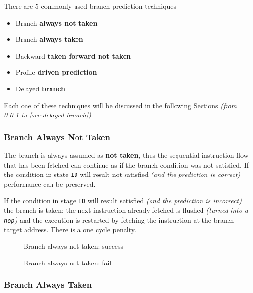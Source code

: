 \documentclass[english]{article}
\begin{document}
There are \(5\) commonly used branch prediction techniques:

\begin{itemize}
  \item Branch \textbf{always not taken}
  \item Branch \textbf{always taken}
  \item Backward \textbf{taken forward not taken}
  \item Profile \textbf{driven prediction}
  \item Delayed \textbf{branch}
\end{itemize}

Each one of these techniques will be discussed in the following Sections \textit{(from \ref{sec:branch-always-not-taken} to \ref{sec:delayed-branch})}.

\subsubsection{Branch Always Not Taken}
\label{sec:branch-always-not-taken}

The branch is always assumed as \textbf{not taken}, thus the sequential instruction flow that has been fetched can continue as if the branch condition was not satisfied.
If the condition in state \texttt{ID} will result not satisfied \textit{(and the prediction is correct)} performance can be preserved.

If the condition in stage \texttt{ID} will result satisfied \textit{(and the prediction is incorrect)} the branch is taken: the next instruction already fetched is flushed \textit{(turned into a \texttt{nop})} and the execution is restarted by fetching the instruction at the branch target address.
There is a one cycle penalty.

\begin{figure}[htbp]
  \bigskip
  \centering
  \caption{Branch always not taken: success}
  \label{fig:branch-always-not-taken}
  \bigskip
\end{figure}

\begin{figure}[htbp]
  \bigskip
  \centering
  \caption{Branch always not taken: fail}
  \label{fig:branch-always-not-taken-fail}
  \bigskip
\end{figure}

\subsubsection{Branch Always Taken}
\label{sec:branch-always-taken}
\end{document}

